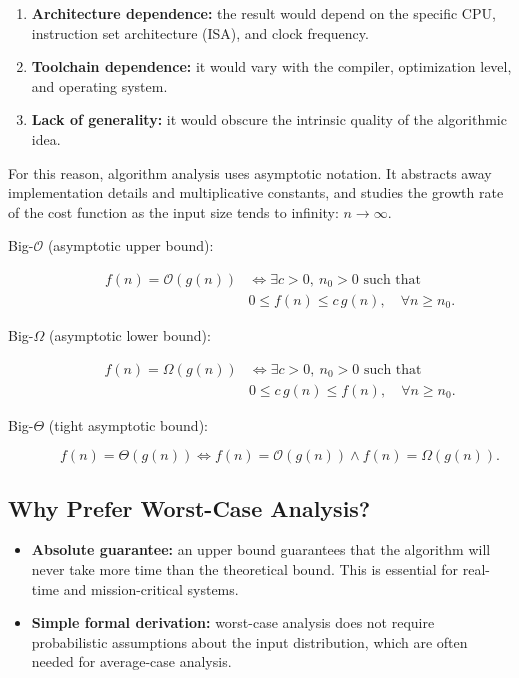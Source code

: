 \begin{enumerate}
  \item \textbf{Architecture dependence:} the result would depend on the
    specific CPU, instruction set architecture (ISA), and clock frequency.
  \item \textbf{Toolchain dependence:} it would vary with the compiler,
    optimization level, and operating system.
  \item \textbf{Lack of generality:} it would obscure the intrinsic quality of
    the algorithmic idea.
\end{enumerate}

For this reason, algorithm analysis uses asymptotic notation. It abstracts
away implementation details and multiplicative constants, and studies the
growth rate of the cost function as the input size tends to infinity:
$n \to \infty$.

\begin{description}
  \item[Big-$\mathcal{O}$ (asymptotic upper bound):]
    \[
      \begin{aligned}
        f(n) = \mathcal{O}(g(n)) &\iff
        \exists c > 0,\ n_0 > 0\text{ such that}\\
        &0 \leq f(n) \leq c\,g(n),\quad \forall n \geq n_0.
      \end{aligned}
    \]
  \item[Big-$\Omega$ (asymptotic lower bound):]
    \[
      \begin{aligned}
        f(n) = \Omega(g(n)) &\iff
        \exists c > 0,\ n_0 > 0\text{ such that}\\
        &0 \leq c\,g(n) \leq f(n),\quad \forall n \geq n_0.
      \end{aligned}
    \]
  \item[Big-$\Theta$ (tight asymptotic bound):]
    \[
      f(n) = \Theta(g(n)) \iff
      f(n) = \mathcal{O}(g(n)) \land f(n) = \Omega(g(n)).
    \]
\end{description}

\subsection{Why Prefer Worst-Case Analysis?}

\begin{itemize}
  \item \textbf{Absolute guarantee:} an upper bound guarantees that the
    algorithm will never take more time than the theoretical bound. This is
    essential for real-time and mission-critical systems.
  \item \textbf{Simple formal derivation:} worst-case analysis does not
    require probabilistic assumptions about the input distribution, which are
    often needed for average-case analysis.
\end{itemize}

